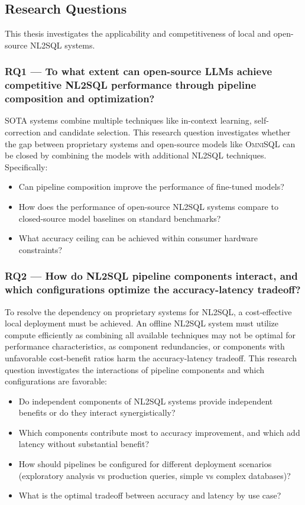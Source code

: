 \subsection{Research Questions}\label{section:introduction:research-questions}

This thesis investigates the applicability and competitiveness of local and
open-source NL2SQL systems.

\subsubsection*{RQ1 — To what extent can open-source LLMs achieve competitive NL2SQL performance through pipeline composition and optimization?}

SOTA systems combine multiple techniques like in-context learning,
self-correction and candidate selection. This research question investigates
whether the gap between proprietary systems and open-source models like
\textsc{OmniSQL} can be closed by combining the models with additional NL2SQL
techniques. Specifically:

\begin{itemize}
    \item Can pipeline composition improve the performance of fine-tuned models?
    \item How does the performance of open-source NL2SQL systems compare to
        closed-source model baselines on standard benchmarks?
    \item What accuracy ceiling can be achieved within consumer hardware constraints?
\end{itemize}

\subsubsection*{RQ2 — How do NL2SQL pipeline components interact, and which configurations optimize the accuracy-latency tradeoff?}

To resolve the dependency on proprietary systems for NL2SQL, a cost-effective
local deployment must be achieved. An offline NL2SQL system must utilize
compute efficiently as combining all available techniques may not be optimal
for performance characteristics, as component redundancies, or components with
unfavorable cost-benefit ratios harm the accuracy-latency tradeoff. This research
question investigates the interactions of pipeline components and which
configurations are favorable:

\begin{itemize}
    \item Do independent components of NL2SQL systems provide independent
        benefits or do they interact synergistically?
    \item Which components contribute most to accuracy improvement, and which add
        latency without substantial benefit?
    \item How should pipelines be configured for different deployment scenarios (exploratory
        analysis vs production queries, simple vs complex databases)?
    \item What is the optimal tradeoff between accuracy and latency by use case?
\end{itemize}
